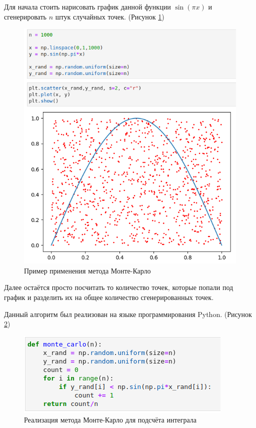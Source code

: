 \documentclass[14pt,fleqn]{extarticle}
\begin{document}
	Для начала стоить нарисовать график данной функции $\sin (\pi x)$ и сгенерировать $n$ штук случайных точек.  (Рисунок \ref{fig:monte_carlo_example})
	\begin{figure}[h]
		\centering \includegraphics[scale=0.6]{monte_carlo_example}
		\caption{Пример применения метода Монте-Карло}
		\label{fig:monte_carlo_example}
	\end{figure}
	
	Далее остаётся просто посчитать то количество точек, которые попали под график и разделить их на общее количество сгенерированных точек.
	
	\newpage
	
	Данный алгоритм был реализован на языке программирования Python. (Рисунок \ref{fig:monte_carlo_code})
	\begin{figure}[h]
		\centering \includegraphics[scale=0.65]{monte_carlo_code}
		\caption{Реализация метода Монте-Карло для подсчёта интеграла}
		\label{fig:monte_carlo_code}
	\end{figure}
\end{document}
